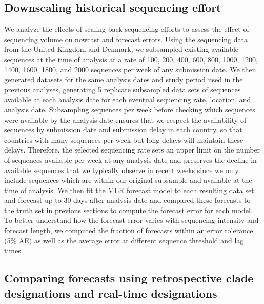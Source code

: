 \subsection*{Downscaling historical sequencing effort}

We analyze the effects of scaling back sequencing efforts to assess the effect of sequencing volume on nowcast and forecast errors.
Using the sequencing data from the United Kingdom and Denmark, we subsampled existing available sequences at the time of analysis at a rate of 100, 200, 400, 600, 800, 1000, 1200, 1400, 1600, 1800, and 2000 sequences per week of any submission date.
We then generated datasets for the same analysis dates and study period used in the previous analyses, generating 5 replicate subsampled data sets of sequences available at each analysis date for each eventual sequencing rate, location, and analysis date.
Subsampling sequences per week before checking which sequences were available by the analysis date ensures that we respect the availability of sequences by submission date and submission delay in each country, so that countries with many sequences per week but long delays will maintain these delays.
Therefore, the selected sequencing rate sets an upper limit on the number of sequences available per week at any analysis date and preserves the decline in available sequences that we typically observe in recent weeks since we only include sequences which are within our original subsample and available at the time of analysis.
We then fit the MLR forecast model to each resulting data set and forecast up to 30 days after analysis date and compared these forecasts to the truth set in previous sections to compute the forecast error for each model.
To better understand how the forecast error varies with sequencing intensity and forecast length, we computed the fraction of forecasts within an error tolerance (5\% AE) as well as the average error at different sequence threshold and lag times.

\subsection*{Comparing forecasts using retrospective clade designations and real-time designations}

